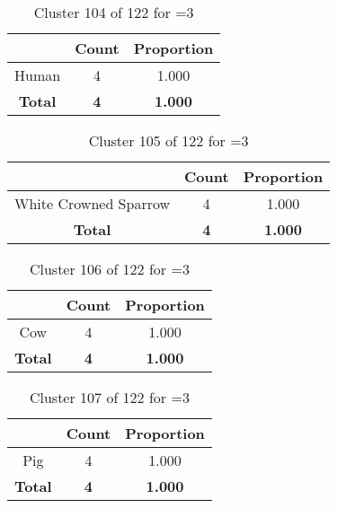 \begin{table}[ht!]
\centering
\begin{tabular}{|c|c|c|}
\hline
\bf \Spec{} &\bf Count &\bf Proportion\\ \hline \hline
Human & 4 & 1.000\\ \hline
\hline
\bf Total & \bf 4 & \bf 1.000\\ \hline
\end{tabular}
\label{tab:cluster:104:3}
\caption{Cluster 104 of 122 for \minneigh{}=3}
\end{table}

\begin{table}[ht!]
\centering
\begin{tabular}{|c|c|c|}
\hline
\bf \Spec{} &\bf Count &\bf Proportion\\ \hline \hline
White Crowned Sparrow & 4 & 1.000\\ \hline
\hline
\bf Total & \bf 4 & \bf 1.000\\ \hline
\end{tabular}
\label{tab:cluster:105:3}
\caption{Cluster 105 of 122 for \minneigh{}=3}
\end{table}

\begin{table}[ht!]
\centering
\begin{tabular}{|c|c|c|}
\hline
\bf \Spec{} &\bf Count &\bf Proportion\\ \hline \hline
Cow & 4 & 1.000\\ \hline
\hline
\bf Total & \bf 4 & \bf 1.000\\ \hline
\end{tabular}
\label{tab:cluster:106:3}
\caption{Cluster 106 of 122 for \minneigh{}=3}
\end{table}

\begin{table}[ht!]
\centering
\begin{tabular}{|c|c|c|}
\hline
\bf \Spec{} &\bf Count &\bf Proportion\\ \hline \hline
Pig & 4 & 1.000\\ \hline
\hline
\bf Total & \bf 4 & \bf 1.000\\ \hline
\end{tabular}
\label{tab:cluster:107:3}
\caption{Cluster 107 of 122 for \minneigh{}=3}
\end{table}

